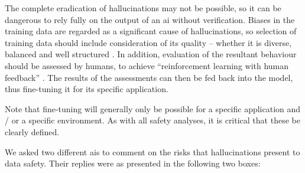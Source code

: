 The complete eradication of hallucinations may not be possible, so it can be dangerous to rely fully
on the output of an \gls{ai} without verification. Biases in the training data are regarded as a
significant cause of hallucinations, so selection of training data should include consideration
of its quality -- whether it is diverse, balanced and well structured
\cite{citation:halucinations:website}. In addition, evaluation of the resultant behaviour should be
assessed by humans, to achieve ``reinforcement learning with human feedback''
\cite{citation:howchatgptworks:website}.
The results of the assessments can then be fed back into the model,
thus fine-tuning it for its specific application.

Note that fine-tuning will generally only be possible for a specific application and / or a specific
environment. As with all safety analyses, it is critical that these be clearly defined.

We asked two different \glspl{ai} to comment on the risks that hallucinations present to data safety. Their replies were as presented in the
following two boxes:

